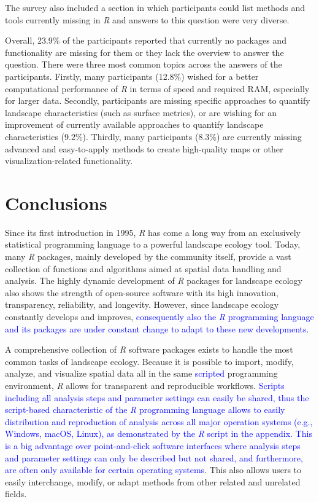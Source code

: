 \documentclass[smallextended]{svjour3}       %
\begin{document}
The survey also included a section in which participants could list methods and tools currently missing in \textit{R} and answers to this question were very diverse.

Overall, 23.9\% of the participants reported that currently no packages and functionality are missing for them or they lack the overview to answer the question.
There were three most common topics across the answers of the participants.
Firstly, many participants (12.8\%) wished for a better computational performance of \textit{R} in terms of speed and required RAM, especially for larger data.
Secondly, participants are missing specific approaches to quantify landscape characteristics (such as surface metrics), or are wishing for an improvement of currently available approaches to quantify landscape characteristics (9.2\%).
Thirdly, many participants (8.3\%) are currently missing advanced and easy-to-apply methods to create high-quality maps or other visualization-related functionality.

\hypertarget{conclusions}{%
\section{Conclusions}\label{conclusions}}

Since its first introduction in 1995, \textit{R} has come a long way from an exclusively statistical programming language to a powerful landscape ecology tool.
Today, many \textit{R} packages, mainly developed by the community itself, provide a vast collection of functions and algorithms aimed at spatial data handling and analysis.
The highly dynamic development of \textit{R} packages for landscape ecology also shows the strength of open-source software with its high innovation, transparency, reliability, and longevity.
However, since landscape ecology constantly develops and improves, \textcolor{blue}{consequently also the \textit{R} programming language and its packages are under constant change to adapt to these new developments.}

A comprehensive collection of \textit{R} software packages exists to handle the most common tasks of landscape ecology.
Because it is possible to import, modify, analyze, and visualize spatial data all in the same \textcolor{blue}{scripted} programming environment, \textit{R} allows for transparent and reproducible workflows.
\textcolor{blue}{Scripts including all analysis steps and parameter settings can easily be shared, thus the script-based characteristic of the \textit{R} programming language allows to easily distribution and reproduction of analysis across all major operation systems (e.g., Windows, macOS, Linux), as demonstrated by the \textit{R} script in the appendix.
This is a big advantage over point-and-click software interfaces where analysis steps and parameter settings can only be described but not shared, and furthermore, are often only available for certain operating systems.}
This also allows users to easily interchange, modify, or adapt methods from other related and unrelated fields.
\end{document}
